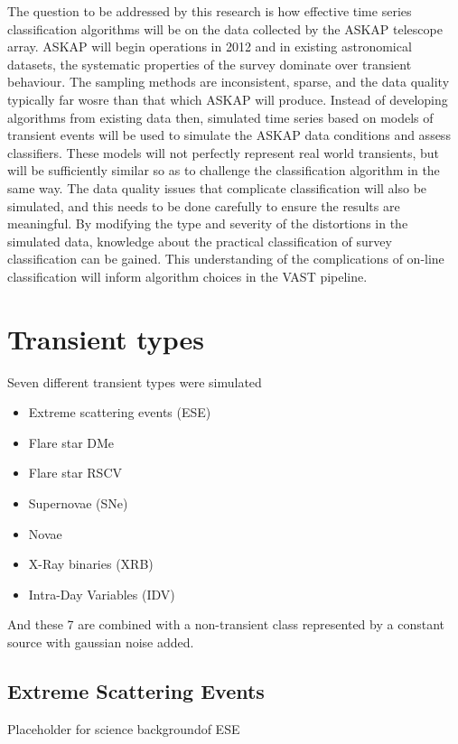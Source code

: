 		The question to be addressed by this research is how effective time series classification algorithms will be on the data collected by the ASKAP telescope array. ASKAP will begin operations in 2012 and in existing astronomical datasets, the systematic properties of the survey dominate over transient behaviour. The sampling methods are inconsistent, sparse, and the data quality typically far wosre than that which ASKAP will produce. Instead of developing algorithms from existing data then, simulated time series based on models of transient events will be used to simulate the ASKAP data conditions and assess classifiers. These models will not perfectly represent real world transients, but will be sufficiently similar so as to challenge the classification algorithm in the same way. The data quality issues that complicate classification will also be simulated, and this needs to be done carefully to ensure the results are meaningful. By modifying the type and severity of the distortions in the simulated data, knowledge about the practical classification of survey classification can be gained. This understanding of the complications of on-line classification will inform algorithm choices in the VAST pipeline. %
	
	\section{Transient types}
		Seven different transient types were simulated %
		\begin{itemize}	
			\item Extreme scattering events (ESE)
			\item Flare star DMe %
			\item Flare star RSCV %
			\item Supernovae (SNe) %
			\item Novae
			\item X-Ray binaries (XRB)
			\item Intra-Day Variables (IDV)
		\end{itemize}
	And these 7 are combined with a non-transient class represented by a constant source with gaussian noise added.
	
	\subsection{Extreme Scattering Events}
	Placeholder for science backgroundof ESE %
	
